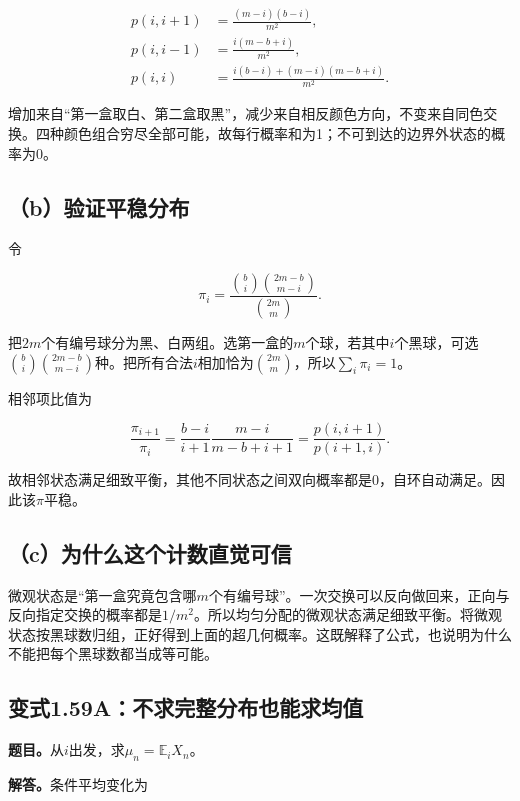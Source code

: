 \documentclass[
  11pt,a4paper,UTF8,fontset=fandol]{ctexart}
\begin{document}
\[
\begin{aligned}
p(i,i+1)&=\frac{(m-i)(b-i)}{m^2},\\
p(i,i-1)&=\frac{i(m-b+i)}{m^2},\\
p(i,i)&=\frac{i(b-i)+(m-i)(m-b+i)}{m^2}.
\end{aligned}
\]

增加来自``第一盒取白、第二盒取黑''，减少来自相反颜色方向，不变来自同色交换。四种颜色组合穷尽全部可能，故每行概率和为1；不可到达的边界外状态的概率为0。

\subsection{（b）验证平稳分布}\label{bux9a8cux8bc1ux5e73ux7a33ux5206ux5e03}

令

\[
\pi_i=\frac{\binom bi\binom{2m-b}{m-i}}{\binom{2m}m}.
\]

把\(2m\)个有编号球分为黑、白两组。选第一盒的\(m\)个球，若其中\(i\)个黑球，可选\(\binom bi\binom{2m-b}{m-i}\)种。把所有合法\(i\)相加恰为\(\binom{2m}m\)，所以\(\sum_i\pi_i=1\)。

相邻项比值为

\[
\frac{\pi_{i+1}}{\pi_i}
=\frac{b-i}{i+1}\frac{m-i}{m-b+i+1}
=\frac{p(i,i+1)}{p(i+1,i)}.
\]

故相邻状态满足细致平衡，其他不同状态之间双向概率都是0，自环自动满足。因此该\(\pi\)平稳。

\subsection{（c）为什么这个计数直觉可信}\label{cux4e3aux4ec0ux4e48ux8fd9ux4e2aux8ba1ux6570ux76f4ux89c9ux53efux4fe1}

微观状态是``第一盒究竟包含哪\(m\)个有编号球''。一次交换可以反向做回来，正向与反向指定交换的概率都是\(1/m^2\)。所以均匀分配的微观状态满足细致平衡。将微观状态按黑球数归组，正好得到上面的超几何概率。这既解释了公式，也说明为什么不能把每个黑球数都当成等可能。

\subsection{变式1.59A：不求完整分布也能求均值}\label{ux53d8ux5f0f1.59aux4e0dux6c42ux5b8cux6574ux5206ux5e03ux4e5fux80fdux6c42ux5747ux503c}

\textbf{题目。}从\(i\)出发，求\(\mu_n=\mathbb E_iX_n\)。

\textbf{解答。}条件平均变化为
\end{document}
